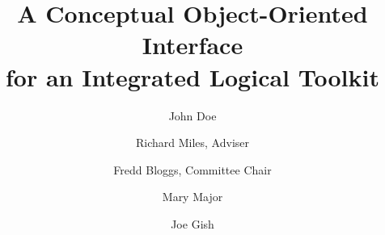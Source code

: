 \documentclass[10pt,letterpaper,openany]{book}
\author{John Doe}
\title{A Conceptual Object-Oriented Interface\\ for an Integrated Logical Toolkit}
\begin{document}
\maketitle
\copyrightpage

\frontmatter



\begin{signatures}
  \signature[Richard Miles]{Richard Miles, Adviser}
  \signature[Fred Bloggs]{Fredd Bloggs, Committee Chair}
  \signature[Mary Major]{Mary Major}
  \signature[Joe Gish]{Joe Gish}
  
\end{signatures}

\dedication{To everyone who's helped me succeed}



\tableofcontents
\listoftables
\listoffigures

\mainmatter








\backmatter

\nocite{*}

\end{document}

